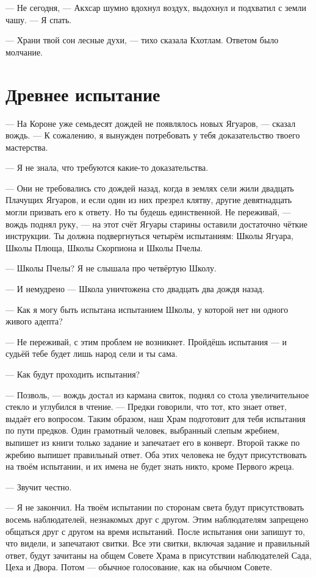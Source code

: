 --- Не сегодня, --- Акхсар шумно вдохнул воздух, выдохнул и подхватил с земли чашу.
--- Я спать.

--- Храни твой сон лесные духи, --- тихо сказала Кхотлам.
Ответом было молчание.

\section{Древнее испытание}

--- На Короне уже семьдесят дождей не появлялось новых Ягуаров, --- сказал вождь.
--- К сожалению, я вынужден потребовать у тебя доказательство твоего мастерства.

--- Я не знала, что требуются какие-то доказательства.

--- Они не требовались сто дождей назад, когда в землях сели жили двадцать Плачущих Ягуаров, и если один из них презрел клятву, другие девятнадцать могли призвать его к ответу.
Но ты будешь единственной.
Не переживай, --- вождь поднял руку, --- на этот счёт Ягуары старины оставили достаточно чёткие инструкции.
Ты должна подвергнуться четырём испытаниям: Школы Ягуара, Школы Плюща, Школы Скорпиона и Школы Пчелы.

--- Школы Пчелы?
Я не слышала про четвёртую Школу.

--- И немудрено --- Школа уничтожена сто двадцать два дождя назад.

--- Как я могу быть испытана испытанием Школы, у которой нет ни одного живого адепта?

--- Не переживай, с этим проблем не возникнет.
Пройдёшь испытания --- и судьёй тебе будет лишь народ сели и ты сама.

--- Как будут проходить испытания?

--- Позволь, --- вождь достал из кармана свиток, поднял со стола увеличительное стекло и углубился в чтение.
--- Предки говорили, что тот, кто знает ответ, выдаёт его вопросом.
Таким образом, наш Храм подготовит для тебя испытания по пути предков.
Один грамотный человек, выбранный слепым жребием, выпишет из книги только задание и запечатает его в конверт.
Второй также по жребию выпишет правильный ответ.
Оба этих человека не будут присутствовать на твоём испытании, и их имена не будет знать никто, кроме Первого жреца.

--- Звучит честно.

--- Я не закончил.
На твоём испытании по сторонам света будут присутствовать восемь наблюдателей, незнакомых друг с другом.
Этим наблюдателям запрещено общаться друг с другом на время испытаний.
После испытания они запишут то, что видели, и запечатают свитки.
Все эти свитки, включая задание и правильный ответ, будут зачитаны на общем Совете Храма в присутствии наблюдателей Сада, Цеха и Двора.
Потом --- обычное голосование, как на обычном Совете.

